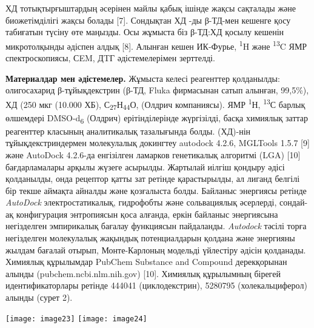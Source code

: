 \begin{multicols}{2}
ХД тотықтырғыштардың әсерінен майлы қабық ішінде жақсы сақталады және
биожетімділігі жақсы болады {[}7{]}. Сондықтан ХД -ды β-ТД-мен кешенге
қосу табиғатын түсіну өте маңызды. Осы жұмыста біз β-ТД:ХД қосылу
кешенін микротолқынды әдіспен алдық {[}8{]}. Алынған кешен ИК-Фурье,
\textsuperscript{1}H және \textsuperscript{13}C ЯМР спектроскопиясы,
СEM, ДTГ әдістемелерімен зерттелді.

{\bfseries Материалдар мен әдістемелер.} Жұмыста келесі реагенттер
қолданылды: олигосахарид β-тұйықдекстрин (β-ТД, Fluka фирмасынан сатып
алынған, 99,5\%), ХД (250 мкг (10.000 ХБ),
С\textsubscript{27}Н\textsubscript{44}О, (Олдрич компаниясы). ЯМР
\textsuperscript{1}Н, \textsuperscript{13}С барлық өлшемдері
DMSO-d\textsubscript{6} (Олдрич) ерітінділерінде жүргізілді, басқа
химиялық заттар реагенттер класының аналитикалық тазалығында болды.
(ХД)-нін тұйықдекстриндермен молекулалық докингтеу autodock 4.2.6,
MGLTools 1.5.7 {[}9{]} және AutoDock 4.2.6-да енгізілген ламарков
генетикалық алгоритмі (LGA) {[}10{]} бағдарламалары арқылы жүзеге
асырылды. Жартылай иілгіш қондыру әдісі қолданылды, онда рецептор қатты
зат ретінде қарастырылды, ал лиганд белгілі бір текше аймақта айналды
және қозғалыста болды. Байланыс энергиясы ретінде \emph{AutoDock}
электростатикалық, гидрофобты және сольвациялық әсерлерді, сондай-ақ
конфигурация энтропиясын қоса алғанда, еркін байланыс энергиясына
негізделген эмпирикалық бағалау функциясын пайдаланды. \emph{Autodock}
тәсілі торға негізделген молекулалық жақындық потенциалдарын қолдана
және энергияны жылдам бағалай отырып, Монте-Карлоның модельді үйлестіру
әдісін қолданады. Химиялық құрылымдар PubChem Substance and Compound
дерекқорынан алынды (pubchem.ncbi.nlm.nih.gov) {[}10{]}. Химиялық
құрылымның бірегей идентификаторлары ретінде 444041 (циклодекстрин),
5280795 (холекальциферол) алынды (сурет 2).

{\centering
\texttt{[image: image23]}
}
{\centering
\texttt{[image: image24]}
}


\end{multicols}
